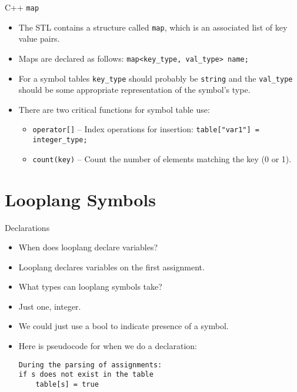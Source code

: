 \documentclass[]{beamer}
\begin{document}
\begin{frame}[fragile]{C++ \texttt{map}}
    \begin{itemize}[<+->]
        \item The STL contains a structure called \texttt{map}, which
            is an associated list of key value pairs.
        \item Maps are declared as follows:
            \newline\verb!map<key_type, val_type> name;!
        \item For a symbol tables \verb!key_type! should probably be
            \texttt{string} and the \verb!val_type! should be some
            appropriate representation of the symbol's type.
        \item There are two critical functions for symbol table use:
            \begin{itemize}
                \item \texttt{operator[]} -- Index operations for
                insertion:
                \newline\verb!table["var1"] = integer_type;!
                \item \texttt{count(key)} -- Count the number of
                    elements matching the key (0 or 1).
            \end{itemize}
    \end{itemize}
\end{frame}

\section{Looplang Symbols}

\begin{frame}[fragile]{Declarations}
    \begin{itemize}[<+->]
        \item When does looplang declare variables?
        \item Looplang declares variables on the first assignment.
        \item What types can looplang symbols take?
        \item Just one, integer.
        \item We could just use a bool to indicate presence of
            a symbol.
        \item Here is pseudocode for when we do a declaration:
        \begin{verbatim}
During the parsing of assignments:
if s does not exist in the table
    table[s] = true
        \end{verbatim}
    \end{itemize}
\end{frame}
\end{document}
